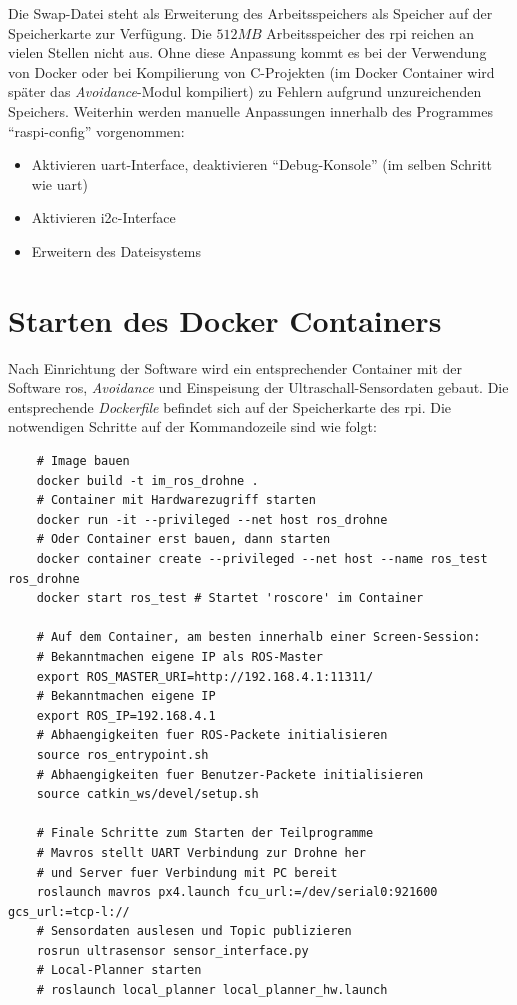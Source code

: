 Die Swap-Datei steht als Erweiterung des Arbeitsspeichers als Speicher auf der Speicherkarte zur Verfügung. Die $512MB$ Arbeitsspeicher des \gls{rpi} reichen an vielen Stellen nicht aus. Ohne diese Anpassung kommt es bei der Verwendung von Docker oder bei Kompilierung von C-Projekten (im Docker Container wird später das \textit{Avoidance}-Modul kompiliert) zu Fehlern aufgrund unzureichenden Speichers.\newline
Weiterhin werden manuelle Anpassungen innerhalb des Programmes \enquote{raspi-config} vorgenommen:
\begin{itemize}
    \item Aktivieren \acrshort{uart}-Interface, deaktivieren \enquote{Debug-Konsole} (im selben Schritt wie \gls{uart})
    \item Aktivieren \acrshort{i2c}-Interface
    \item Erweitern des Dateisystems
\end{itemize}

\section{Starten des Docker Containers}
Nach Einrichtung der Software wird ein entsprechender Container mit der Software \acrshort{ros}, \textit{Avoidance} und Einspeisung der Ultraschall-Sensordaten gebaut. Die entsprechende \textit{Dockerfile} befindet sich auf der Speicherkarte des \gls{rpi}. Die notwendigen Schritte auf der Kommandozeile sind wie folgt:
\begin{verbatim}
    # Image bauen
    docker build -t im_ros_drohne .
    # Container mit Hardwarezugriff starten
    docker run -it --privileged --net host ros_drohne
    # Oder Container erst bauen, dann starten
    docker container create --privileged --net host --name ros_test ros_drohne
    docker start ros_test # Startet 'roscore' im Container

    # Auf dem Container, am besten innerhalb einer Screen-Session:
    # Bekanntmachen eigene IP als ROS-Master
    export ROS_MASTER_URI=http://192.168.4.1:11311/
    # Bekanntmachen eigene IP
    export ROS_IP=192.168.4.1
    # Abhaengigkeiten fuer ROS-Packete initialisieren
    source ros_entrypoint.sh
    # Abhaengigkeiten fuer Benutzer-Packete initialisieren
    source catkin_ws/devel/setup.sh
    
    # Finale Schritte zum Starten der Teilprogramme
    # Mavros stellt UART Verbindung zur Drohne her
    # und Server fuer Verbindung mit PC bereit
    roslaunch mavros px4.launch fcu_url:=/dev/serial0:921600 gcs_url:=tcp-l://
    # Sensordaten auslesen und Topic publizieren
    rosrun ultrasensor sensor_interface.py
    # Local-Planner starten
    # roslaunch local_planner local_planner_hw.launch
\end{verbatim}

